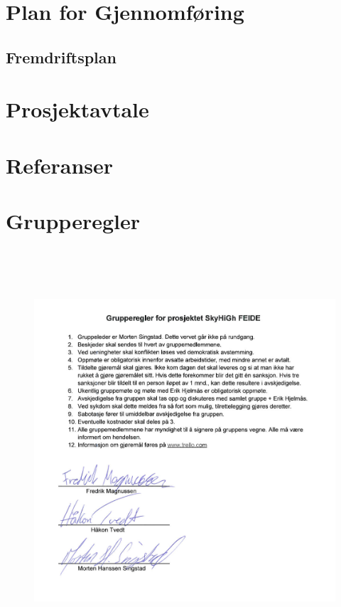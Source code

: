 \documentclass[12pt,a4paper]{article}
\begin{document}
\section{Plan for Gjennomføring}
\subsection{Fremdriftsplan}

\section{Prosjektavtale}

\section{Referanser}

\newpage
\section{Grupperegler}
\begin{flushright}
	\begin{figure}[h]
		\includegraphics[width=150mm,height=150mm]{grupperegler.png}
 	\end{figure}
\end{flushright}
\end{document}
